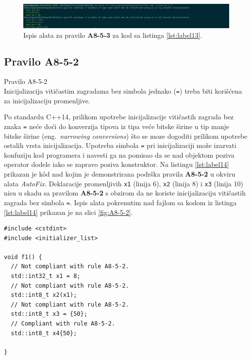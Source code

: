 \documentclass[12pt,oneside]{memoir}
\begin{document}
\begin{figure}[!h]
\begin{center}
\includegraphics[scale=0.3]{A8-5-3.png}
\end{center}
\caption{Ispis alata za pravilo \textbf{A8-5-3} za kod sa listinga \ref{lst:label13}.}
\label{fig:A8-5-3}
\end{figure}

\subsection{Pravilo A8-5-2}
\begin{center}
\begin{tcolorbox}
Pravilo A8-5-2 \\
Inicijalizacija viti\v{c}astim zagradama bez simbola jednako (\texttt{=}) treba biti kori\v{s}\'{c}ena za inicijalizaciju promenljive.
\end{tcolorbox}
\end{center}

Po standardu C++14, prilikom upotrebe inicijalizacije viti\v{c}astih zagrada bez znaka \texttt{=} ne\'{c}e do\'{c}i do konverzija tipova iz tipa ve\'{c}e bitske \v{s}irine u tip manje bitske \v{s}irine (eng.~\textit{narrowing conversions}) \v{s}to se moze dogoditi prilikom upotrebe ostalih vrsta inicijalizacija.
Upotreba simbola \texttt{=} pri inicijalizaciji mo\v{z}e izazvati konfuziju kod programera i navesti ga na pomisao da se nad objektom poziva operator dodele iako se zapravo poziva konstruktor.
Na listingu \ref{lst:label14} prikazan je k\^{o}d nad kojim je demonstrirana podr\v{s}ka pravila \textbf{A8-5-2} u okviru alata \textit{AutoFix}.
Deklaracije promenljivih \texttt{x1} (linija 6), \texttt{x2} (linija 8) i \texttt{x3} (linija 10) nisu u skadu sa pravilom \textbf{A8-5-2} s obzirom da ne koriste inicijalizaciju viti\v{c}astih zagrada bez simbola \texttt{=}. 
Ispis alata pokrenutim nad fajlom sa kodom iz listinga \ref{lst:label14} prikazan je na slici \ref{fig:A8-5-2}. \\

\begin{lstlisting}[style=customc, caption={K\^{o}d nad kojim je demonstrirana podr\v{s}ka pravila \textbf{A8-5-2} u okviru alata \textit{AutoFix}.}, label=lst:label14]
#include <cstdint>
#include <initializer_list>

void f1() {
  // Not compliant with rule A8-5-2.
  std::int32_t x1 = 8;
  // Not compliant with rule A8-5-2.
  std::int8_t x2(x1);
  // Not compliant with rule A8-5-2.
  std::int8_t x3 = {50};
  // Compliant with rule A8-5-2.
  std::int8_t x4{50};

}
\end{lstlisting}
\end{document}
